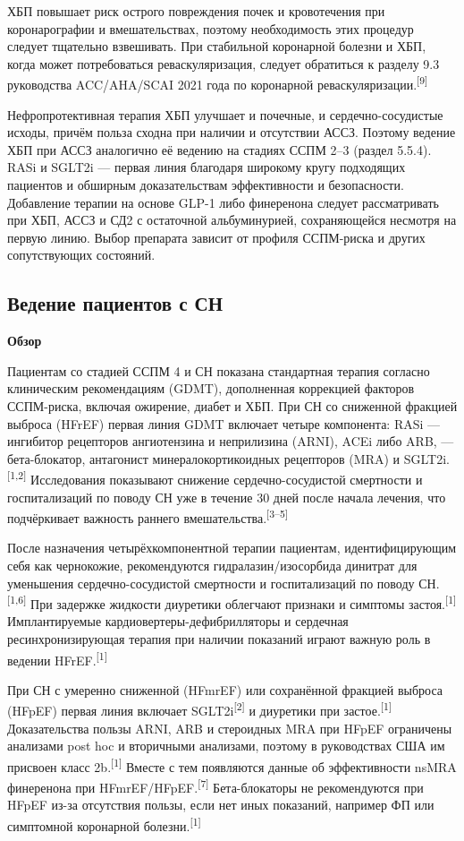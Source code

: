 \documentclass[11pt,a4paper]{article}
\newcommand{\src}[1]{\textsuperscript{[#1]}}
\newcommand{\heading}[1]{\par\medskip\textbf{#1}\par}
\begin{document}
ХБП повышает риск острого повреждения почек и кровотечения при коронарографии и вмешательствах, поэтому необходимость этих процедур следует тщательно взвешивать. При стабильной коронарной болезни и ХБП, когда может потребоваться реваскуляризация, следует обратиться к разделу 9.3 руководства ACC/AHA/SCAI 2021 года по коронарной реваскуляризации.\src{9}

Нефропротективная терапия ХБП улучшает и почечные, и сердечно-сосудистые исходы, причём польза сходна при наличии и отсутствии АССЗ. Поэтому ведение ХБП при АССЗ аналогично её ведению на стадиях ССПМ 2--3 (раздел 5.5.4). RASi и SGLT2i --- первая линия благодаря широкому кругу подходящих пациентов и обширным доказательствам эффективности и безопасности. Добавление терапии на основе GLP-1 либо финеренона следует рассматривать при ХБП, АССЗ и СД2 с остаточной альбуминурией, сохраняющейся несмотря на первую линию. Выбор препарата зависит от профиля ССПМ-риска и других сопутствующих состояний.

\subsection{Ведение пациентов с СН}
\heading{Обзор}
Пациентам со стадией ССПМ 4 и СН показана стандартная терапия согласно клиническим рекомендациям (GDMT), дополненная коррекцией факторов ССПМ-риска, включая ожирение, диабет и ХБП. При СН со сниженной фракцией выброса (HFrEF) первая линия GDMT включает четыре компонента: RASi --- ингибитор рецепторов ангиотензина и неприлизина (ARNI), ACEi либо ARB, --- бета-блокатор, антагонист минералокортикоидных рецепторов (MRA) и SGLT2i.\src{1,2} Исследования показывают снижение сердечно-сосудистой смертности и госпитализаций по поводу СН уже в течение 30 дней после начала лечения, что подчёркивает важность раннего вмешательства.\src{3--5}

После назначения четырёхкомпонентной терапии пациентам, идентифицирующим себя как чернокожие, рекомендуются гидралазин/изосорбида динитрат для уменьшения сердечно-сосудистой смертности и госпитализаций по поводу СН.\src{1,6} При задержке жидкости диуретики облегчают признаки и симптомы застоя.\src{1} Имплантируемые кардиовертеры-дефибрилляторы и сердечная ресинхронизирующая терапия при наличии показаний играют важную роль в ведении HFrEF.\src{1}

При СН с умеренно сниженной (HFmrEF) или сохранённой фракцией выброса (HFpEF) первая линия включает SGLT2i\src{2} и диуретики при застое.\src{1} Доказательства пользы ARNI, ARB и стероидных MRA при HFpEF ограничены анализами post hoc и вторичными анализами, поэтому в руководствах США им присвоен класс 2b.\src{1} Вместе с тем появляются данные об эффективности nsMRA финеренона при HFmrEF/HFpEF.\src{7} Бета-блокаторы не рекомендуются при HFpEF из-за отсутствия пользы, если нет иных показаний, например ФП или симптомной коронарной болезни.\src{1}
\end{document}
